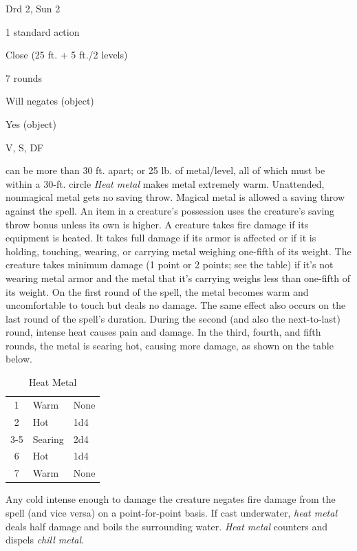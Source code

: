 
\begin{description*}
\item[Level:] Drd 2, Sun 2
\item[Casting Time:] 1 standard action
\item[Range:] Close (25 ft. + 5 ft./2 levels)
\item[Duration:] 7 rounds
\item[Saving Throw:] Will negates (object)
\item[Spell Resistance:] Yes (object)
\item[Components:] V, S, DF
\end{description*}

can be more than 30 ft. apart; or 25 lb. of metal/level, all of which must be within
a 30-ft. circle
\textit{Heat metal} makes metal extremely warm. Unattended, nonmagical metal gets
no saving throw. Magical metal is allowed a saving throw against the spell. An
item in a creature's possession uses the creature's saving throw bonus unless its
own is higher.
A creature takes fire damage if its equipment is heated. It takes full damage if
its armor is affected or if it is holding, touching, wearing, or carrying metal
weighing one-fifth of its weight. The creature takes minimum damage (1 point or
2 points; see the table) if it's not wearing metal armor and the metal that it's
carrying weighs less than one-fifth of its weight.
On the first round of the spell, the metal becomes warm and uncomfortable to touch
but deals no damage. The same effect also occurs on the last round of the spell's
duration. During the second (and also the next-to-last) round, intense heat causes
pain and damage. In the third, fourth, and fifth rounds, the metal is searing hot,
causing more damage, as shown on the table below.
\begin{table}[htb]
\caption{Heat Metal}
\centering
\begin{tabular}{c l l}
1 & Warm & None\\
2 & Hot & 1d4\\
3-5 & Searing & 2d4\\
6 & Hot & 1d4\\
7 & Warm & None\\
\end{tabular}
\end{table}
Any cold intense enough to damage the creature negates fire damage from the spell
(and vice versa) on a point-for-point basis. If cast underwater, \textit{heat metal
}deals half damage and boils the surrounding water.
\textit{Heat metal} counters and dispels \textit{chill metal}.
